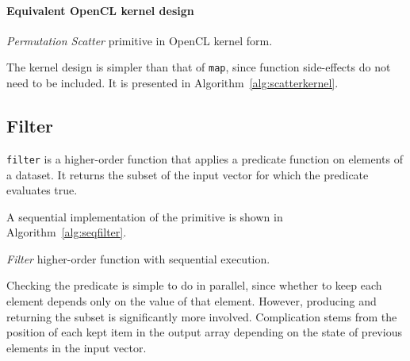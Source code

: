 \paragraph*{Equivalent \ac{OpenCL} kernel design}
\begin{algorithm}
  \caption{\emph{Permutation Scatter} primitive in \ac{OpenCL} kernel form.}
  \label{alg:scatterkernel}
  \begin{algorithmic}
    \EndFunction
  \end{algorithmic}
\end{algorithm}

The kernel design is simpler than that of \verb|map|, since function side-effects do not need to be included. It is presented in Algorithm~\ref{alg:scatterkernel}.

\subsection{Filter}
\verb|filter| is a higher-order function that applies a predicate function on elements of a dataset. It returns the subset of the input vector for which the predicate evaluates true. 

A sequential implementation of the primitive is shown in Algorithm~\ref{alg:seqfilter}.

\begin{algorithm}
  \caption{\emph{Filter} higher-order function with sequential execution.}
  \label{alg:seqfilter}

  \begin{algorithmic}
      \EndIf
      \EndFor
    \EndFunction
  \end{algorithmic}
\end{algorithm}

Checking the predicate is simple to do in parallel, since whether to keep each element depends only on the value of that element. However, producing and returning the subset is significantly more involved. Complication stems from the position of each kept item in the output array depending on the state of previous elements in the input vector.

